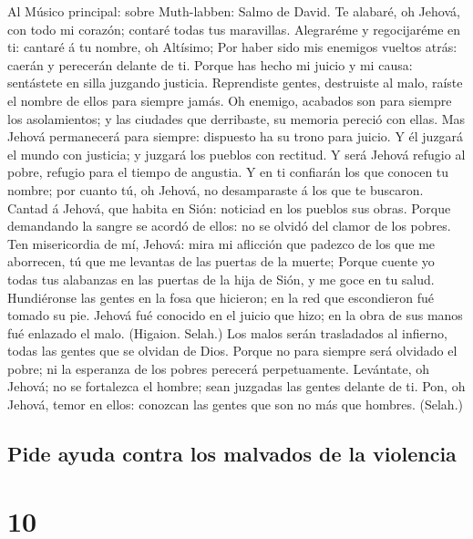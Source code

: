  Al Músico principal: sobre Muth-labben: Salmo de David.
Te alabaré, oh Jehová, con todo mi corazón; contaré todas tus
maravillas.  Alegraréme y regocijaréme en ti: cantaré á tu
nombre, oh Altísimo;  Por haber sido mis enemigos vueltos
atrás: caerán y perecerán delante de ti.  Porque has hecho
mi juicio y mi causa: sentástete en silla juzgando justicia.
 Reprendiste gentes, destruiste al malo, raíste el nombre
de ellos para siempre jamás.  Oh enemigo, acabados son
para siempre los asolamientos; y las ciudades que derribaste, su memoria
pereció con ellas.  Mas Jehová permanecerá para siempre:
dispuesto ha su trono para juicio.  Y él juzgará el mundo
con justicia; y juzgará los pueblos con rectitud.  Y será
Jehová refugio al pobre, refugio para el tiempo de angustia.
 Y en ti confiarán los que conocen tu nombre; por cuanto
tú, oh Jehová, no desamparaste á los que te buscaron. 
Cantad á Jehová, que habita en Sión: noticiad en los pueblos sus obras.
 Porque demandando la sangre se acordó de ellos: no se
olvidó del clamor de los pobres.  Ten misericordia de mí,
Jehová: mira mi aflicción que padezco de los que me aborrecen, tú que me
levantas de las puertas de la muerte;  Porque cuente yo
todas tus alabanzas en las puertas de la hija de Sión, y me goce en tu
salud.  Hundiéronse las gentes en la fosa que hicieron;
en la red que escondieron fué tomado su pie.  Jehová fué
conocido en el juicio que hizo; en la obra de sus manos fué enlazado el
malo. (Higaion. Selah.)  Los malos serán trasladados al
infierno, todas las gentes que se olvidan de Dios. 
Porque no para siempre será olvidado el pobre; ni la esperanza de los
pobres perecerá perpetuamente.  Levántate, oh Jehová; no
se fortalezca el hombre; sean juzgadas las gentes delante de ti.
 Pon, oh Jehová, temor en ellos: conozcan las gentes que
son no más que hombres. (Selah.)

\hypertarget{pide-ayuda-contra-los-malvados-de-la-violencia}{%
\subsection{Pide ayuda contra los malvados de la
violencia}\label{pide-ayuda-contra-los-malvados-de-la-violencia}}

\hypertarget{section-9}{%
\section{10}\label{section-9}}

